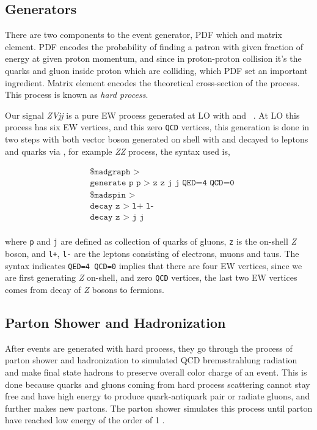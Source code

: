 \subsection{
  Generators
}

There are two components to the event generator,
\gls{PDF} which and matrix element.
\gls{PDF} encodes the probability of finding a patron
with given fraction of energy at given proton momentum,
and since in proton-proton collision it's the quarks and gluon
inside proton which are colliding, which \gls{PDF} set
an important ingredient. Matrix element encodes
the theoretical cross-section of the process. This process
is known as \textit{hard process}.

Our signal \textit{ZVjj} is a pure \gls{EW} process generated
at \gls{LO} with \MGvATNLO{} and \MADSPIN{}~\cite{madgraph,madspin}.
At \gls{LO} this process has six \gls{EW} vertices, and this
zero \texttt{QCD} vertices, this generation is done
in two steps with both vector boson generated on shell
with \MADGRAPH{} and decayed to leptons and quarks via \MADSPIN{},
for example \textit{ZZ} process, the syntax used is,

\begin{align*}
   & \texttt{\$ madgraph >}                      \\
   & \texttt{generate p p > z z j j QED=4 QCD=0} \\
   & \texttt{\$ madspin >}                       \\
   & \texttt{decay z > l+ l-}                    \\
   & \texttt{decay z > j j}                      \\
\end{align*}

where \texttt{p} and \texttt{j} are defined as collection of quarks of gluons,
\texttt{z} is the on-shell \textit{Z} boson, and \texttt{l+}, \texttt{l-}
are the leptons consisting of electrons, muons and taus. The syntax
indicates \texttt{QED=4 QCD=0} implies that there are four \gls{EW}
vertices, since we are first generating \textit{Z} on-shell, and zero
\texttt{QCD} vertices, the last two \gls{EW} vertices comes from
decay of \textit{Z} bosons to fermions.

\subsection{
  Parton Shower and Hadronization
}

After events are generated with hard process,
they go through the process of parton shower and hadronization
to simulated QCD bremsstrahlung radiation
and make final state hadrons to preserve overall color charge of an event.
This is done because quarks and gluons coming from hard process scattering
cannot stay free and have high energy to produce quark-antiquark
pair or radiate gluons, and further makes new partons.
The parton shower simulates this process until parton
have reached low energy of the order of 1 \GeV{}.

